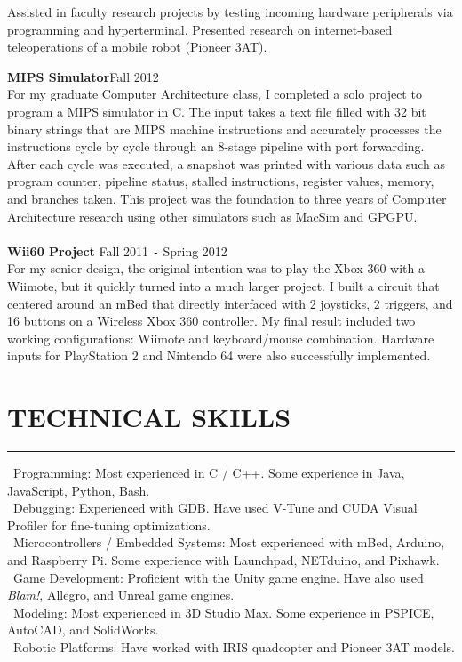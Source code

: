 \documentclass{res}
\begin{document}
\begin{resume}
\begin{tabbing}
	\end{tabbing}\vspace{-20pt}
	\vspace{8pt}Assisted in faculty research projects by testing incoming hardware peripherals via programming and hyperterminal. Presented research on internet-based teleoperations of a mobile robot (Pioneer 3AT).
	
	{\bf MIPS Simulator}\hfill Fall 2012\\
	For my graduate Computer Architecture class, I completed a solo project to program a MIPS simulator in C. The input takes a text file filled with 32 bit binary strings that are MIPS machine instructions and accurately processes the instructions cycle by cycle through an 8-stage pipeline with port forwarding. After each cycle was executed, a snapshot was printed with various data such as program counter, pipeline status, stalled instructions, register values, memory, and branches taken. This project was the foundation to three years of Computer Architecture research using other simulators such as MacSim and GPGPU.\\\\
	{\bf Wii60 Project} \hfill Fall 2011 \texttt{-} Spring 2012 \\
	For my senior design, the original intention was to play the Xbox 360 with a Wiimote, but it quickly turned into a much larger project. I built a circuit that centered around an mBed that directly interfaced with 2 joysticks, 2 triggers, and 16 buttons on a Wireless Xbox 360 controller. My final result included two working configurations: Wiimote and keyboard/mouse combination. Hardware inputs for PlayStation 2 and Nintendo 64 were also successfully implemented.
	
\section{TECHNICAL SKILLS}
	\vspace{0.005in}	
	\rule{\textwidth}{0.5pt}	
		\textbullet \ Programming: Most experienced in C / C++. Some experience in Java, JavaScript, Python, Bash.\\
		\textbullet \ Debugging: Experienced with GDB. Have used V-Tune and CUDA Visual Profiler for fine-tuning optimizations.\\
		\textbullet \ Microcontrollers / Embedded Systems: Most experienced with mBed, Arduino, and Raspberry Pi. Some experience with Launchpad, NETduino, and Pixhawk.\\
		\textbullet \ Game Development: Proficient with the Unity game engine. Have also used \textit{Blam!}, Allegro, and Unreal game engines.\\
		\textbullet \ Modeling: Most experienced in 3D Studio Max. Some experience in PSPICE, AutoCAD, and SolidWorks.\\
		\textbullet \ Robotic Platforms: Have worked with IRIS quadcopter and Pioneer 3AT models.



\end{resume}
\end{document}
